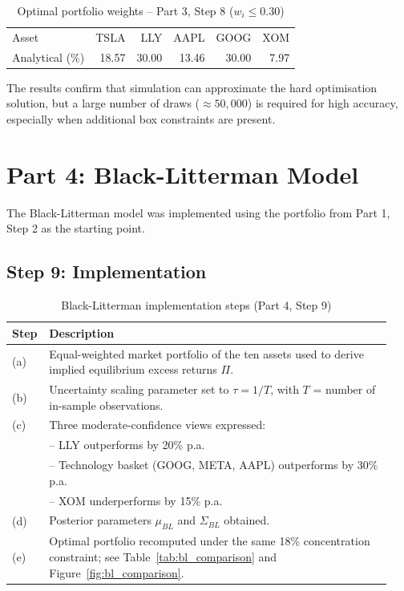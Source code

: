 \documentclass[11pt,a4paper]{article}
\begin{document}
\begin{table}[H]
\centering
\caption{Optimal portfolio weights -- Part 3, Step 8 ($w_i \leq 0.30$)}
\begin{tabular}{lrrrrr}
\toprule
Asset & TSLA & LLY & AAPL & GOOG & XOM \\
Analytical (\%) & 18.57 & 30.00 & 13.46 & 30.00 & 7.97 \\
\bottomrule
\end{tabular}
\label{tab:step8}
\end{table}

The results confirm that simulation can approximate the hard optimisation solution, but a large number of draws ($\approx 50{,}000$) is required for high accuracy, especially when additional box constraints are present.


\section{Part 4: Black-Litterman Model}

The Black-Litterman model was implemented using the portfolio from Part 1, Step 2 as the starting point.

\subsection{Step 9: Implementation}

\begin{table}[H]
\centering
\caption{Black-Litterman implementation steps (Part 4, Step 9)}
\begin{tabular}{@{}p{0.06\linewidth}@{}p{0.88\linewidth}@{}}
\toprule
Step & Description \\
\midrule
(a) & Equal-weighted market portfolio of the ten assets used to derive implied equilibrium excess returns \(\Pi\). \\
(b) & Uncertainty scaling parameter set to \(\tau = 1/T\), with \(T\) = number of in-sample observations. \\
(c) & Three moderate-confidence views expressed:\\
    & -- LLY outperforms by 20\% p.a.\\
    & -- Technology basket (GOOG, META, AAPL) outperforms by 30\% p.a.\\
    & -- XOM underperforms by 15\% p.a.\\
(d) & Posterior parameters \(\mu_{BL}\) and \(\Sigma_{BL}\) obtained. \\
(e) & Optimal portfolio recomputed under the same 18\% concentration constraint; see Table~\ref{tab:bl_comparison} and Figure~\ref{fig:bl_comparison}. \\
\bottomrule
\end{tabular}
\end{table}
\end{document}
